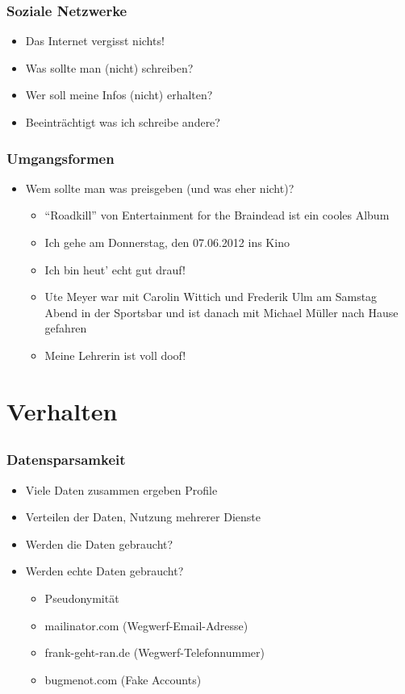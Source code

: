 \documentclass[12pt]{beamer}
\begin{document}
\begin{frame}
    \frametitle{Soziale Netzwerke}
    \begin{itemize}
        \item<2-> Das Internet vergisst nichts!
        \item<3-> Was sollte man (nicht) schreiben?
        \item<5-> Wer soll meine Infos (nicht) erhalten?
        \item<6-> Beeinträchtigt was ich schreibe andere?
    \end{itemize}
\end{frame}

\begin{frame}
  \frametitle{Umgangsformen}
  \begin{itemize}
    \item Wem sollte man was preisgeben (und was eher nicht)?
      \begin{itemize}
        \item<2-> "`Roadkill"' von Entertainment for the Braindead ist ein cooles Album
        \item<3-> Ich gehe am Donnerstag, den 07.06.2012 ins Kino
        \item<4-> Ich bin heut' echt gut drauf!
        \item<5-> Ute Meyer war mit Carolin Wittich und Frederik Ulm am Samstag Abend in der Sportsbar und ist danach mit Michael Müller nach Hause gefahren
        \item<6-> Meine Lehrerin ist voll doof!
      \end{itemize}
  \end{itemize}
\end{frame}

\section{Verhalten}
\subsection{}

\begin{frame}
    \frametitle{Datensparsamkeit}
    \begin{itemize}
        \item<2-> Viele Daten zusammen ergeben Profile
        \item<3-> Verteilen der Daten, Nutzung mehrerer Dienste
        \item<4-> Werden die Daten gebraucht?
        \item<5-> Werden echte Daten gebraucht?
          \begin{itemize}
            \item<6-> Pseudonymität
            \item<7-> mailinator.com (Wegwerf-Email-Adresse)
            \item<8-> frank-geht-ran.de (Wegwerf-Telefonnummer)
            \item<9-> bugmenot.com (Fake Accounts)
          \end{itemize}
    \end{itemize}
\end{frame}
\end{document}
